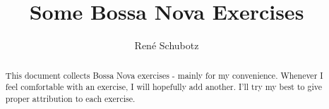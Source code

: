 \documentclass{article}
\title{Some Bossa Nova Exercises}
\author{Ren\'e Schubotz}
\begin{document}
\maketitle

\begin{abstract}
This document collects Bossa Nova exercises - mainly for my convenience.
Whenever I feel comfortable with an exercise, I will hopefully add another. 
I'll try my best to give proper attribution to each exercise.
\end{abstract}

\nopagebreak

\end{document}
